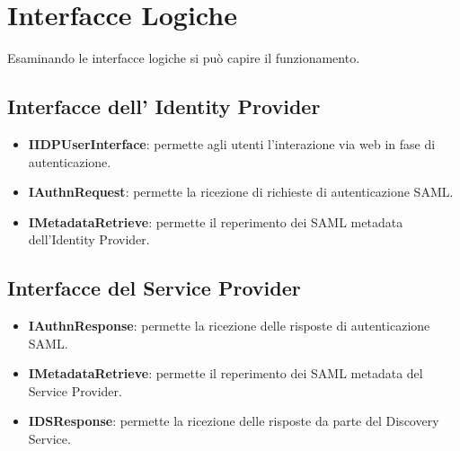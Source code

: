\section{Interfacce Logiche}
Esaminando le interfacce logiche si può capire il funzionamento.
\subsection{Interfacce dell' Identity Provider}
\begin{itemize}
    \item \textbf{IIDPUserInterface}: permette agli utenti l’interazione via web in fase di autenticazione.
    \item \textbf{IAuthnRequest}: permette la ricezione di richieste di autenticazione SAML.
    \item \textbf{IMetadataRetrieve}: permette il reperimento dei SAML metadata dell’Identity Provider.
\end{itemize}
\subsection{Interfacce del Service Provider}
\begin{itemize}
    \item \textbf{IAuthnResponse}: permette la ricezione delle risposte di autenticazione SAML.
    \item \textbf{IMetadataRetrieve}: permette il reperimento dei SAML metadata del Service Provider.
    \item \textbf{IDSResponse}: permette la ricezione delle risposte da parte del Discovery Service.
\end{itemize}
\pagebreak